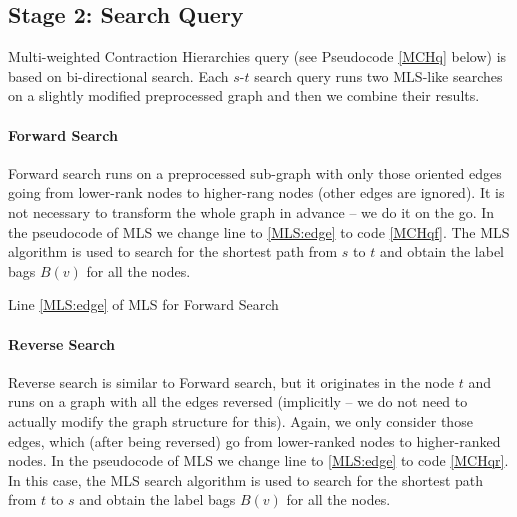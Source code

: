 
\subsection{Stage 2: Search Query}
\label{subsecStage2}

Multi-weighted Contraction Hierarchies query (see Pseudocode \ref{MCHq} below) is based on bi-directional search.
Each $s$-$t$ search query runs two MLS-like searches on a slightly modified preprocessed graph
and then we combine their results. 

\paragraph*{Forward Search}
Forward search runs on a preprocessed sub-graph with only those oriented edges going from 
lower-rank nodes to higher-rang nodes
(other edges are ignored). It is not necessary to transform the whole graph in advance -- we do it on the go. 
In the pseudocode of MLS we change line to \ref{MLS:edge} to code \ref{MCHqf}.
The MLS algorithm is used to search for the shortest path from $s$ to $t$ and obtain the label bags $B(v)$ for all the nodes.

\begin{algorithm}[H]
    \SetAlgoLined
    \caption{Line \ref{MLS:edge} of MLS for Forward Search}
    \label{MCHqf}
\end{algorithm}

\paragraph*{Reverse Search}
Reverse search is similar to Forward search, but it originates in the node $t$ and runs on a graph with all the edges reversed (implicitly -- we do not need to actually modify the graph structure for this). Again, we only consider those edges, which (after being reversed) go from lower-ranked nodes to higher-ranked nodes. 
In the pseudocode of MLS we change line to \ref{MLS:edge} to code \ref{MCHqr}.
In this case, the MLS search algorithm is used to search for the shortest path from $t$ to $s$ and obtain the label bags $B(v)$ for all the nodes.

